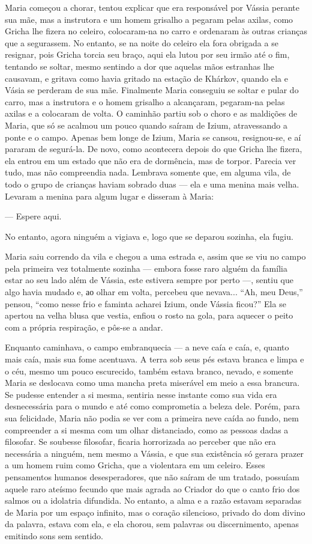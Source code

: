 Maria começou a chorar, tentou explicar que era responsável por Vássia
perante sua mãe, mas a instrutora e um homem grisalho a pegaram pelas
axilas, como Gricha lhe fizera no celeiro, colocaram-na no carro e
ordenaram às outras crianças que a segurassem. No entanto, se na noite
do celeiro ela fora obrigada a se resignar, pois Gricha torcia seu
braço, aqui ela lutou por seu irmão até o fim, tentando se soltar, mesmo
sentindo a dor que aquelas mãos estranhas lhe causavam, e gritava como
havia gritado na estação de Khárkov, quando ela e Vásia se perderam de
sua mãe. Finalmente Maria conseguiu se soltar e pular do carro, mas a
instrutora e o homem grisalho a alcançaram, pegaram-na pelas axilas e a
colocaram de volta. O caminhão partiu sob o choro e as maldições de
Maria, que só se acalmou um pouco quando saíram de Izium, atravessando a
ponte e o campo. Apenas bem longe de Izium, Maria se cansou,
resignou-se, e aí pararam de segurá-la. De novo, como acontecera depois
do que Gricha lhe fizera, ela entrou em um estado que não era de
dormência, mas de torpor. Parecia ver tudo, mas não compreendia nada.
Lembrava somente que, em alguma vila, de todo o grupo de crianças haviam
sobrado duas --- ela e uma menina mais velha. Levaram a menina para
algum lugar e disseram à Maria:

--- Espere aqui.

No entanto, agora ninguém a vigiava e, logo que se deparou sozinha, ela
fugiu.

Maria saiu correndo da vila e chegou a uma estrada e, assim que se viu
no campo pela primeira vez totalmente sozinha --- embora fosse raro
alguém da família estar ao seu lado além de Vássia, este estivera sempre
por perto ---, sentiu que algo havia mudado e, ао olhar em volta,
percebeu que nevava... ``Ah, meu Deus,'' pensou, ``como nesse frio e
faminta acharei Izium, onde Vássia ficou?'' Ela se apertou na velha
blusa que vestia, enfiou o rosto na gola, para aquecer o peito com a
própria respiração, e pôs-se a andar.

Enquanto caminhava, o campo embranquecia --- a neve caía e caía, e,
quanto mais caía, mais sua fome acentuava. A terra sob seus pés estava
branca e limpa e o céu, mesmo um pouco escurecido, também estava branco,
nevado, e somente Maria se deslocava como uma mancha preta miserável em
meio a essa brancura. Se pudesse entender a si mesma, sentiria nesse
instante como sua vida era desnecessária para o mundo e até como
comprometia a beleza dele. Porém, para sua felicidade, Maria não podia
se ver com a primeira neve caída ao fundo, nem compreender a si mesma
com um olhar distanciado, como as pessoas dadas a filosofar. Se soubesse
filosofar, ficaria horrorizada ao perceber que não era necessária a
ninguém, nem mesmo a Vássia, e que sua existência só gerara prazer a um
homem ruim como Gricha, que a violentara em um celeiro. Esses
pensamentos humanos desesperadores, que não saíram de um tratado,
possuíam aquele raro ateísmo fecundo que mais agrada ao Criador do que o
canto frio dos salmos ou a idolatria difundida. No entanto, a alma e a
razão estavam separadas de Maria por um espaço infinito, mas o coração
silencioso, privado do dom divino da palavra, estava com ela, e ela
chorou, sem palavras ou discernimento, apenas emitindo sons sem sentido.

